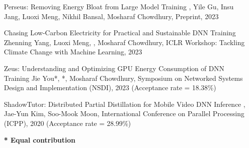



\begin{cvlist}

  \cvlistitem
    {Perseus: Removing Energy Bloat from Large Model Training} %
    {, Yile Gu, Insu Jang, Luoxi Meng, Nikhil Bansal, Mosharaf Chowdhury, Preprint, 2023} %

  \cvlistitem
    {Chasing Low-Carbon Electricity for Practical and Sustainable DNN Training} %
    {Zhenning Yang, Luoxi Meng, , Mosharaf Chowdhury, ICLR Workshop: Tackling Climate Change with Machine Learning, 2023} %

  \cvlistitem
    {Zeus: Understanding and Optimizing GPU Energy Consumption of DNN Training} %
    {Jie You*, *, Mosharaf Chowdhury, Symposium on Networked Systems Design and Implementation (NSDI), 2023 (Acceptance rate = 18.38\%)} %

  \cvlistitem
    {ShadowTutor: Distributed Partial Distillation for Mobile Video DNN Inference} %
    {, Jae-Yun Kim, Soo-Mook Moon, International Conference on Parallel Processing (ICPP), 2020 (Acceptance rate = 28.99\%)} %

\end{cvlist}

\vspace{-5mm}
\begin{cvparagraph}
  \textbf{* Equal contribution}
\end{cvparagraph}
